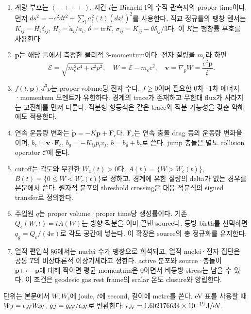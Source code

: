 \begin{enumerate}
\def\labelenumi{\arabic{enumi}.}
\tightlist
\item
  계량 부호는 \((-+++ )\), 시간 \(t\)는 Bianchi I의 수직 관측자의 proper time이다. 먼저 \(ds^2=-c^2dt^2+\sum_i a_i^2(t)(dx^i)^2\)를 사용한다. 직교 정규틀의 팽창 텐서는 \(K_{ij}=H_i\delta_{ij}\), \(H_i=\dot a_i/a_i\), \(\theta=\mathrm{tr}K\), \(\sigma_{ij}=K_{ij}-\theta\delta_{ij}/3\)다. 이 \(K\)는 팽창률 부호를 사용한다.
\item
  \(\boldsymbol p\)는 해당 틀에서 측정한 물리적 3-momentum이다. 전자 질량을 \(m_e\)라 하면 \[
  \mathcal E=\sqrt{m_e^2c^4+c^2p^2},\quad W=\mathcal E-m_ec^2,\quad
  \boldsymbol v=\nabla_pW=\frac{c^2\boldsymbol p}{\mathcal E}.
  \tag{MC3}
  \]
\item
  \(f(t,\boldsymbol p)\,d^3p\)는 proper volume당 전자 수다. \(f\ge0\)이며 필요한 0차·1차 에너지·momentum 모멘트가 유한하다. 경계의 trace가 존재하고 무한대 flux가 사라지는 고전해를 먼저 다룬다. 적분형 항등식은 같은 trace와 적분 가능성을 갖춘 약해에도 적용한다.
\item
  연속 운동량 변화는 \(\dot{\boldsymbol p}=-K\boldsymbol p+\boldsymbol F_c\)다. \(\boldsymbol F_c\)는 연속 충돌 drag 등의 운동량 변화율이며, \(b_c=\boldsymbol v\cdot\boldsymbol F_c\), \(b_g=-K_{ij}p_i v_j\), \(b=b_g+b_c\)로 쓴다. jump 충돌은 별도 collision operator \(\mathcal C\)에 둔다.
\item
  cutoff는 각도와 무관한 \(W_c(t)>0\)다. \(A(t)=\{W>W_c(t)\}\), \(B(t)=\{0\le W<W_c(t)\}\)로 정하고, 경계에 유한 질량의 delta가 없는 경우를 본문에서 쓴다. 원자적 분포의 threshold crossing은 대응 적분식의 signed transfer로 정의한다.
\item
  주입원 \(q\)는 proper volume·proper time당 생성률이다. 기존 \(Q_e(W,t)=tA(W)\)는 방향 적분을 이미 끝낸 source다. 등방 birth를 선택하면 \(q_g=Q_e/(4\pi)\)로 각도 공간에 넣는다. 이 확장은 source의 총 정규화를 유지한다.
\item
  열적 편입식 §6에서는 nuclei 수가 팽창으로 희석되고, 열적 nuclei·전자 집단은 공통 \(T\)의 비상대론적 이상기체라고 정한다. active 분포와 source·충돌이 \(\boldsymbol p\mapsto-\boldsymbol p\)에 대해 짝이면 평균 momentum은 0이면서 비등방 stress는 남을 수 있다. 이 조건은 geodesic gas rest frame의 scalar 온도 closure와 양립한다.
\end{enumerate}

단위는 본문에서 \(W,W_c\)에 joule, \(t\)에 second, 길이에 metre를 쓴다. eV 표를 사용할 때 \(W_J=\epsilon_{\rm eV}W_{\rm eV}\), \(g_J=g_{\rm eV}/\epsilon_{\rm eV}\)로 변환한다. \(\epsilon_{\rm eV}=1.602176634\times10^{-19}\,\mathrm{J/eV}\).

